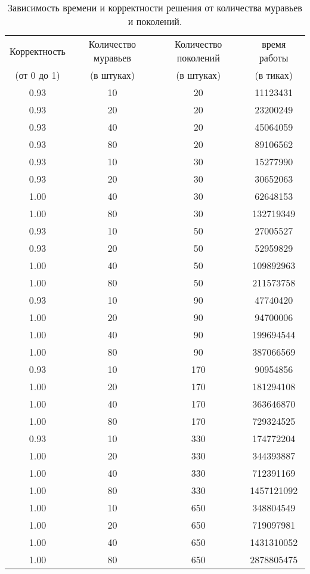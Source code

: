 \documentclass[12pt, a4paper]{report}
\begin{document}
    		\begin{table}[ht!]
    			\centering
    			\begin{tabular}{ | c | c | c | c | }
    				\hline
    				Корректность   &  Количество муравьев   &  Количество поколений  &  время работы \\
    				(от 0 до 1) & (в штуках) & (в штуках) & (в тиках) \\ \hline  
    				0.93 &  10 &  20 &   11123431 \\
    				0.93 & 20 &  20 &   23200249 \\
    				0.93 & 40 &  20 &   45064059 \\
    				0.93 & 80 &  20 &   89106562 \\
    				0.93 & 10 &  30 &   15277990 \\
    				0.93 & 20 &  30 &   30652063 \\
    				1.00 & 40 &  30 &   62648153 \\
    				1.00 & 80 &  30 &  132719349 \\
    				0.93 & 10 &  50 &   27005527 \\
    				0.93 & 20 &  50 &   52959829 \\
    				1.00 & 40 &  50 &  109892963 \\
    				1.00 & 80 &  50 &  211573758 \\
    				0.93 & 10 &  90 &   47740420 \\
    				1.00 & 20 &  90 &   94700006 \\
    				1.00 & 40 &  90 &  199694544 \\
    				1.00 & 80 &  90 &  387066569 \\
    				0.93 & 10 & 170 &   90954856 \\
    				1.00 & 20 & 170 &  181294108 \\
    				1.00 & 40 & 170 &  363646870 \\
    				1.00 & 80 & 170 &  729324525 \\
    				0.93 & 10 & 330 &  174772204 \\
    				1.00 & 20 & 330 &  344393887 \\
    				1.00 & 40 & 330 &  712391169 \\
    				1.00 & 80 & 330 & 1457121092 \\
    				1.00 & 10 & 650 &  348804549 \\
    				1.00 & 20 & 650 &  719097981 \\
    				1.00 & 40 & 650 & 1431310052 \\
    				1.00 & 80 & 650 & 2878805475 \\
    				\hline
    			\end{tabular}
    			\label{tab:ants_time}
    			\caption{Зависимость времени и корректности решения от количества муравьев и поколений.}
    		\end{table} 
    		
\end{document}
